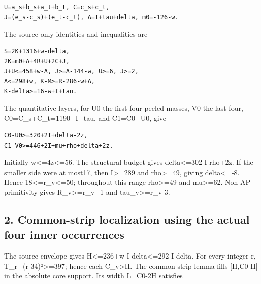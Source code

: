 \documentclass[10pt,a4paper]{article}
\theoremstyle{definition}
\begin{document}
\begin{lstlisting}
U=a_s+b_s+a_t+b_t, C=c_s+c_t,
J=(e_s-c_s)+(e_t-c_t), A=I+tau+delta, m0=-126-w.
\end{lstlisting}

The source-only identities and inequalities are

\begin{lstlisting}
S=2K+1316+w-delta,
2K=m0+A+4R+U+2C+J,
J+U<=458+w-A, J>=A-144-w, U>=6, J>=2,
A<=298+w, K-M>=R-286-w+A,
K-delta>=16-w+I+tau.
\end{lstlisting}

The quantitative layers,\allowbreak{} for U0 the first four peeled masses,\allowbreak{} V0 the
last four,\allowbreak{} C0=\allowbreak{}C\_\allowbreak{}s+\allowbreak{}C\_\allowbreak{}t=\allowbreak{}1190+\allowbreak{}I+\allowbreak{}tau,\allowbreak{} and C1=\allowbreak{}C0+\allowbreak{}U0,\allowbreak{} give

\begin{lstlisting}
C0-U0>=320+2I+delta-2z,
C1-V0>=446+2I+mu+rho+delta+2z.
\end{lstlisting}

Initially w\textless=\allowbreak{}4z\textless=\allowbreak{}56. The structural budget gives
delta\textless=\allowbreak{}302-I-rho+\allowbreak{}2z. If the smaller side were at most17,\allowbreak{} then
I\textgreater=\allowbreak{}289 and rho\textgreater=\allowbreak{}49,\allowbreak{} giving delta\textless=\allowbreak{}-8.
Hence 18\textless=\allowbreak{}r\_\allowbreak{}v\textless=\allowbreak{}50; throughout this range
rho\textgreater=\allowbreak{}49 and mu\textgreater=\allowbreak{}62. Non-AP primitivity gives
R\_\allowbreak{}v\textgreater=\allowbreak{}r\_\allowbreak{}v+\allowbreak{}1 and tau\_\allowbreak{}v\textgreater=\allowbreak{}r\_\allowbreak{}v-3.

\hypertarget{common-strip-localization-using-the-actual-four-inner-occurrences}{%
\subsection{2. Common-strip localization using the actual four inner
occurrences}\label{common-strip-localization-using-the-actual-four-inner-occurrences}}

The source envelope gives H\textless=\allowbreak{}236+\allowbreak{}w-I-delta\textless=\allowbreak{}292-I-delta.
For every integer r,\allowbreak{} T\_\allowbreak{}r+\allowbreak{}(r-34)²\textgreater=\allowbreak{}397; hence each
C\_\allowbreak{}v\textgreater H. The common-strip lemma fills {[}H,\allowbreak{}C0-H{]} in the
absolute core support. Its width L=\allowbreak{}C0-2H satisfies
\end{document}
